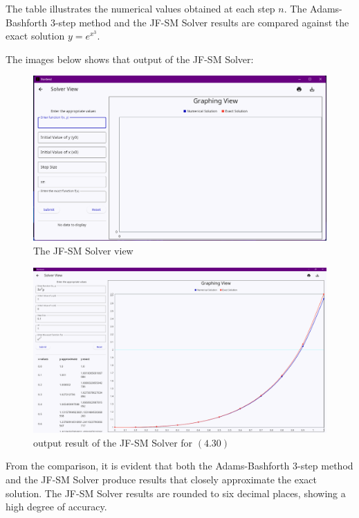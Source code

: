 \documentclass[a4paper, twoside]{report} %
\begin{document}
	The table illustrates the numerical values obtained at each step $n$. The Adams-Bashforth 3-step method and the JF-SM Solver results are compared against the exact solution $y = e^{x^3}$.

	The images below shows that output of the JF-SM Solver:

	\begin{figure}[htbp]
		\centering
		\includegraphics[width=1\textwidth]{chapters/4/image/solver_3.png}
		\caption{The JF-SM Solver view}
	\end{figure}

	\begin{figure}[htbp]
		\centering
		\includegraphics[width=1\textwidth]{chapters/4/image/solver_2.png}
		\caption{output result of the JF-SM Solver for $(4.30)$ }
	\end{figure}


	\pagebreak
	From the comparison, it is evident that both the Adams-Bashforth 3-step method and the JF-SM Solver produce results that closely approximate the exact solution. The JF-SM Solver results are rounded to six decimal places, showing a high degree of accuracy.
\end{document}
